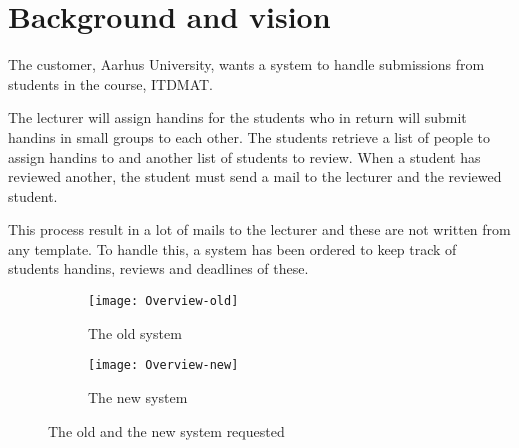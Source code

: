 \documentclass[Main]{subfiles}
\begin{document}
\section{Background and vision}
The customer, Aarhus University, wants a system to handle submissions from students in the course, ITDMAT.

The lecturer will assign handins for the students who in return will submit handins in small groups to each other.
The students retrieve a list of people to assign handins to and another list of students to review.
When a student has reviewed another, the student must send a mail to the lecturer and the reviewed student.

This process result in a lot of mails to the lecturer and these are not written from any template.
To handle this, a system has been ordered to keep track of students handins, reviews and deadlines of these.

\begin{figure}[H]
	\centering
	\begin{subfigure}[b]{0.50\textwidth}
		\texttt{[image: Overview-old]}
		\caption{The old system}
		\label{fig:overview-old}
	\end{subfigure}
	\begin{subfigure}[b]{0.50\textwidth}
		\texttt{[image: Overview-new]}
		\caption{The new system}
		\label{fig:overview-new}
	\end{subfigure}
	\caption{The old and the new system requested}\label{fig:overview}
\end{figure}
\end{document}
